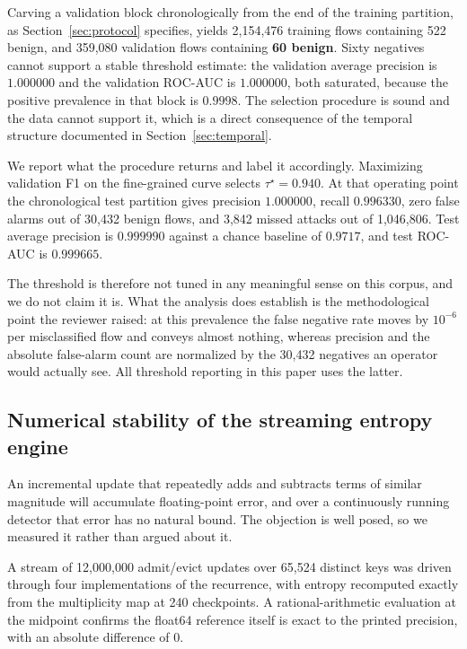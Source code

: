 \documentclass{ieeeaccess}
\begin{document}
Carving a validation block chronologically from the end of the training
partition, as Section~\ref{sec:protocol} specifies, yields 2{,}154{,}476 training
flows containing 522 benign, and 359{,}080 validation flows containing
\textbf{60 benign}. Sixty negatives cannot support a stable threshold estimate:
the validation average precision is $1.000000$ and the validation ROC-AUC is
$1.000000$, both saturated, because the positive prevalence in that block is
$0.9998$. The selection procedure is sound and the data cannot support it, which
is a direct consequence of the temporal structure documented in
Section~\ref{sec:temporal}.

We report what the procedure returns and label it accordingly. Maximizing
validation F1 on the fine-grained curve selects $\tau^{\star} = 0.940$. At that
operating point the chronological test partition gives precision $1.000000$,
recall $0.996330$, zero false alarms out of 30{,}432 benign flows, and 3{,}842
missed attacks out of 1{,}046{,}806. Test average precision is $0.999990$ against
a chance baseline of $0.9717$, and test ROC-AUC is $0.999665$.

The threshold is therefore not tuned in any meaningful sense on this corpus, and
we do not claim it is. What the analysis does establish is the methodological
point the reviewer raised: at this prevalence the false negative rate moves by
$10^{-6}$ per misclassified flow and conveys almost nothing, whereas precision
and the absolute false-alarm count are normalized by the 30{,}432 negatives an
operator would actually see. All threshold reporting in this paper uses the
latter.

\subsection{Numerical stability of the streaming entropy engine}
\label{sec:numerics}
An incremental update that repeatedly adds and subtracts terms of similar
magnitude will accumulate floating-point error, and over a continuously running
detector that error has no natural bound. The objection is well posed, so we
measured it rather than argued about it.

A stream of 12{,}000{,}000 admit/evict updates over 65{,}524 distinct keys was
driven through four implementations of the recurrence, with entropy
recomputed exactly from the multiplicity map at 240 checkpoints. A rational-arithmetic evaluation at the
midpoint confirms the float64 reference itself is exact to the printed
precision, with an absolute difference of $0$.
\end{document}
